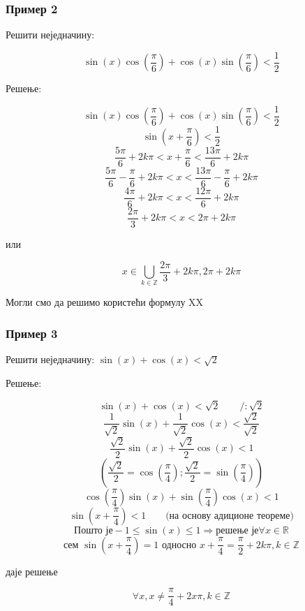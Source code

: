 \documentclass[../diplomski.tex]{subfiles}
\begin{document}
\subsubsection{Пример 2}

Решити неједначину:

\[\sin(x)\cos\left(\frac{\pi}{6}\right)+\cos(x)\sin\left(\frac{\pi}{6}\right)<\frac{1}{2}\]

Решење:



\[\sin(x)\cos\left(\frac{\pi}{6}\right)+\cos(x)\sin\left(\frac{\pi}{6}\right)<\frac{1}{2}\]
\[\sin\left(x+\frac{\pi}{6}\right)<\frac{1}{2}\]
\[\frac{5\pi}{6}+2k\pi<x+\frac{\pi}{6}<\frac{13\pi}{6}+2k\pi\]
\[\frac{5\pi}{6}-\frac{\pi}{6}+2k\pi<x<\frac{13\pi}{6}-\frac{\pi}{6}+2k\pi\]
\[\frac{4\pi}{6}+2k\pi<x<\frac{12\pi}{6}+2k\pi\]
\[\frac{2\pi}{3}+2k\pi<x<2\pi+2k\pi\]
\centerline{или}
\[x\in\bigcup_{k\in\mathbb{Z}}\frac{2\pi}{3}+2k\pi,2\pi+2k\pi\]

Могли смо да решимо користећи формулу XX


\subsubsection{Пример 3}

Решити неједначину: $\sin(x)+\cos(x)<\sqrt{2}$

Решење:

\[\sin(x)+\cos(x)<\sqrt{2}\qquad/:\sqrt{2}\]
\[\frac{1}{\sqrt{2}}\sin(x)+\frac{1}{\sqrt{2}}\cos(x)<\frac{\sqrt{2}}{\sqrt{2}}\]
\[\frac{\sqrt{2}}{2}\sin(x)+\frac{\sqrt{2}}{2}\cos(x)<1\]
\[(\frac{\sqrt{2}}{2}=\cos(\frac{\pi}{4});\frac{\sqrt{2}}{2}=\sin(\frac{\pi}{4}))\]
\[\cos(\frac{\pi}{4})\sin(x)+\sin(\frac{\pi}{4})\cos(x)<1\]
\[\sin(x+\frac{\pi}{4})<1\qquad\text{(на основу адиционе теореме)}\]
\[\text{Пошто је} -1\leqslant\sin(x)\leqslant1\Rightarrow \text{решење је} \forall x\in\mathbb{R}\]
\[\text{сем } \sin\left(x+\frac{\pi}{4}\right)=1\text{ односно }x+\frac{\pi}{4}=\frac{\pi}{2}+2k\pi,k\in\mathbb{Z}\]
\centerline{даје решење}
\[\forall x,x\neq\frac{\pi}{4}+2x\pi,k\in\mathbb{Z}\]
\end{document}
